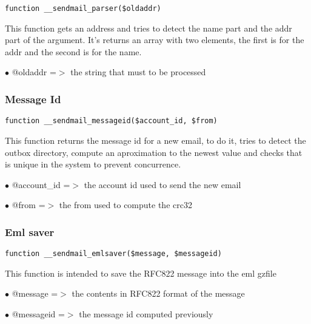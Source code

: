 \documentclass[a4paper]{article}
\begin{document}
\begin{lstlisting}
function __sendmail_parser($oldaddr)
\end{lstlisting}

This function gets an address and tries to detect the name part and the addr
part of the argument. It's returns an array with two elements, the first is
for the addr and the second is for the name.

\begin{compactitem}
\item[\color{myblue}$\bullet$] @oldaddr =$>$ the string that must to be processed
\end{compactitem}

\hypertarget{toc69}{}
\subsubsection{Message Id}

\begin{lstlisting}
function __sendmail_messageid($account_id, $from)
\end{lstlisting}

This function returns the message id for a new email, to do it, tries
to detect the outbox directory, compute an aproximation to the newest
value and checks that is unique in the system to prevent concurrence.

\begin{compactitem}
\item[\color{myblue}$\bullet$] @account\_id =$>$ the account id used to send the new email
\item[\color{myblue}$\bullet$] @from       =$>$ the from used to compute the crc32
\end{compactitem}

\hypertarget{toc70}{}
\subsubsection{Eml saver}

\begin{lstlisting}
function __sendmail_emlsaver($message, $messageid)
\end{lstlisting}

This function is intended to save the RFC822 message into the eml gzfile

\begin{compactitem}
\item[\color{myblue}$\bullet$] @message   =$>$ the contents in RFC822 format of the message
\item[\color{myblue}$\bullet$] @messageid =$>$ the message id computed previously
\end{compactitem}
\end{document}

